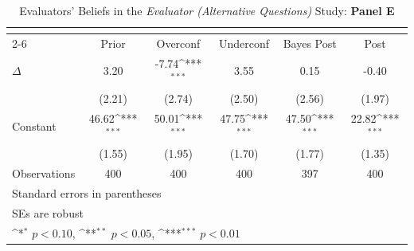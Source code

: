 \begin{table}[htbp]\centering
\def\sym#1{\ifmmode^{#1}\else\(^{#1}\)\fi}
\caption{Evaluators' Beliefs in the \textit{Evaluator (Alternative Questions)} Study: \textbf{Panel E}}
\begin{tabular}{l*{5}{c}}
\hline\hline
                &\multicolumn{5}{c}{}                                                                          \\\cmidrule(lr){2-6}
                &\multicolumn{1}{c}{Prior}&\multicolumn{1}{c}{Overconf}&\multicolumn{1}{c}{Underconf}&\multicolumn{1}{c}{Bayes Post}&\multicolumn{1}{c}{Post}\\
\hline
$\Delta$        &     3.20         &    -7.74\sym{***}&     3.55         &     0.15         &    -0.40         \\
                &   (2.21)         &   (2.74)         &   (2.50)         &   (2.56)         &   (1.97)         \\
Constant        &    46.62\sym{***}&    50.01\sym{***}&    47.75\sym{***}&    47.50\sym{***}&    22.82\sym{***}\\
                &   (1.55)         &   (1.95)         &   (1.70)         &   (1.77)         &   (1.35)         \\
\hline
Observations    &      400         &      400         &      400         &      397         &      400         \\
\hline\hline
\multicolumn{6}{l}{\footnotesize Standard errors in parentheses}\\
\multicolumn{6}{l}{\footnotesize SEs are robust}\\
\multicolumn{6}{l}{\footnotesize \sym{*} \(p<0.10\), \sym{**} \(p<0.05\), \sym{***} \(p<0.01\)}\\
\end{tabular}
\end{table}
